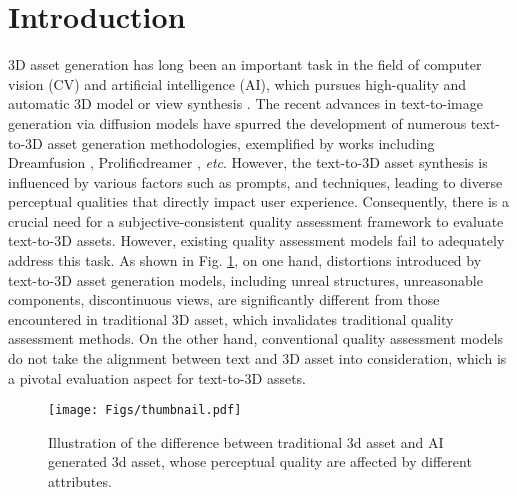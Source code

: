 \section{Introduction}

 3D asset generation has long been an important task in the field of computer vision (CV) and artificial intelligence (AI), which pursues high-quality and automatic 3D model or view synthesis \cite{henzler2019escaping, tsalicoglou2023textmesh}. The recent advances in text-to-image generation via diffusion models have spurred the development of numerous text-to-3D asset generation methodologies, exemplified by works including Dreamfusion \cite{poole2022dreamfusion}, Prolificdreamer \cite{wang2024prolificdreamer}, \textit{etc}. However, the text-to-3D asset synthesis is influenced by various factors such as prompts, and techniques, leading to diverse perceptual qualities that directly impact user experience. Consequently, there is a crucial need for a subjective-consistent quality assessment framework to evaluate text-to-3D assets. However, existing quality assessment models fail to adequately address this task. As shown in Fig. \ref{fig:thumbnail}, on one hand, distortions introduced by text-to-3D asset generation models, including unreal structures, unreasonable components, discontinuous views, are significantly different from those encountered in traditional 3D asset, which invalidates traditional quality assessment methods. On the other hand, conventional quality assessment models do not take the alignment between text and 3D asset into consideration, which is a pivotal evaluation aspect for text-to-3D assets.

\begin{figure}[t]
    \centering
    \texttt{[image: Figs/thumbnail.pdf]}
    \caption{Illustration of the difference between traditional 3d asset and AI generated 3d asset, whose perceptual quality are affected by different attributes.}
    \label{fig:thumbnail}
    \vspace{-0.5cm}
\end{figure}

